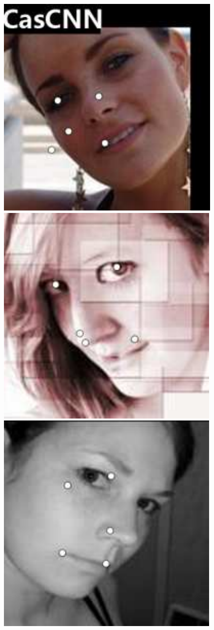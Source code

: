 \documentclass[journal]{IEEEtran}
\begin{document}
\begin{figure}[!htb]
{\begin{minipage}[b]{0.38\textwidth}
\includegraphics[scale=0.22]{5_CascadedCNN_1186}
\includegraphics[scale=0.22]{5_CascadedCNN_500}
\includegraphics[scale=0.22]{5_CascadedCNN_2174}

\end{minipage}}
\end{figure}
\end{document}
